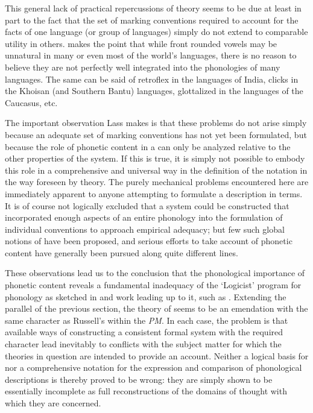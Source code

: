 This general lack of practical repercussions of  theory
seems to be due at least in part to the fact that the set of marking
conventions required to account for the facts of one language (or
group of languages) simply do not extend to comparable utility in
others. \citet{lass75:intrinsic} makes the point that while front
rounded vowels may be unnatural in many or even most of the world's
languages, there is no reason to believe they are not perfectly well
integrated into the phonologies of many  languages. The same
can be said of retroflex  in the languages of India, clicks
in the Khoisan (and Southern Bantu) languages, glottalized  in
the languages of the Caucasus, etc.

The important observation Lass makes is that these problems do not
arise simply because an adequate set of marking conventions has not
yet been formulated, but because the role of phonetic content in a
 can only be analyzed relative to the other
properties of the system. If this is true, it is simply not possible
to embody this role in a comprehensive and universal way in the
definition of the notation in the way foreseen by 
theory. The purely mechanical problems encountered here are
immediately apparent to anyone attempting to formulate a description
in  terms. It is of course not logically excluded that a
system could be constructed that incorporated enough aspects of an
entire phonology into the formulation of individual conventions to
approach empirical adequacy; but few such global notions of 
have been proposed, and serious efforts to take account of phonetic
content have generally been pursued along quite different lines.

These observations lead us to the conclusion that the phonological
importance of phonetic content reveals a fundamental inadequacy of the
`Logicist' program for phonology as sketched in \textsl{} and work
leading up to it, such as \citet{chomsky:genprops}. Extending the
parallel of the previous section, the theory of  seems to be
an emendation with the same character as Russell's 
within the \textsl{PM}. In each case, the problem is that available
ways of constructing a consistent formal system with the required
character lead inevitably to conflicts with the subject matter for
which the theories in question are intended to provide an
account. Neither a logical basis for  nor a comprehensive
notation for the expression and comparison of phonological
descriptions is thereby proved to be wrong: they are simply shown to
be essentially incomplete as full reconstructions of the domains of
thought with which they are concerned.

